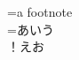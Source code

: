 \documentclass{minimal}
\begin{document}
\nonstopmode
{}
=\vbox{a footnote\\}
=\vbox{あいう\\！えお}
\end{document}
